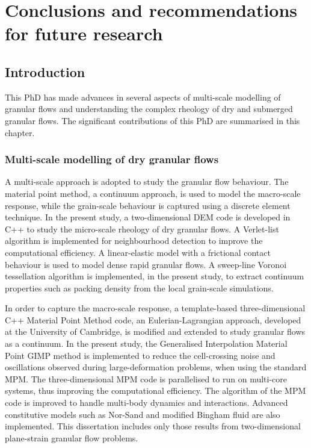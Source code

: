 \chapter{Conclusions and recommendations for future research}

\ifpdf
    \graphicspath{{Chapter7/figs/raster/}{Chapter7/figs/pdf/}{Chapter7/figs/}}
\else
    \graphicspath{{Chapter7/figs/vector/}{Chapter7/figs/}}
\fi
\section{Introduction}

This PhD has made advances in several aspects of multi-scale modelling of 
granular flows and understanding the complex rheology of dry and submerged 
granular flows. The significant contributions of this PhD are summarised in 
this chapter.

\subsection{Multi-scale modelling of dry granular flows}

A multi-scale approach is adopted to study the granular flow behaviour. The 
material point method, a 
continuum approach, is used to model the macro-scale response, while the 
grain-scale behaviour is captured using a discrete element 
technique. In the 
present study, a two-dimensional DEM code is developed in C++ to study the 
micro-scale rheology of dry granular flows. A Verlet-list algorithm is 
implemented for neighbourhood detection to improve the computational 
efficiency. A linear-elastic model with a frictional contact behaviour is used 
to model dense rapid granular flows. A sweep-line Voronoi tessellation 
algorithm 
is implemented, in the present study, to extract continuum properties such as 
packing density from the local grain-scale simulations.

In order to capture the macro-scale response, a template-based 
three-dimensional C++ Material Point Method code, an Eulerian-Lagrangian 
approach, developed at the University of Cambridge, is modified and extended to 
study granular flows as a continuum. In the present study, the Generalised 
Interpolation Material Point GIMP method is implemented to reduce the 
cell-crossing noise and oscillations observed during large-deformation 
problems, 
when using the standard MPM. The three-dimensional MPM code is parallelised to 
run on multi-core systems, thus improving the computational efficiency. The 
algorithm of the MPM code is improved to handle multi-body dynamics and 
interactions. Advanced constitutive models such as Nor-Sand and 
modified Bingham fluid are also implemented. This dissertation includes 
only those results from two-dimensional plane-strain granular flow problems. 


